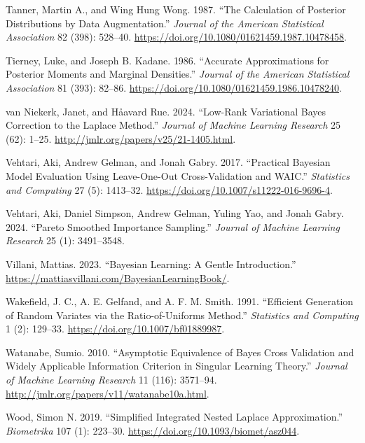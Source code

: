 \documentclass[
  11pt,
  letterpaper,
]{scrbook}
\newlength{\cslhangindent}
\newenvironment{CSLReferences}[2] %
 {\begin{list}{}{%
  \setlength{\itemindent}{0pt}
  \setlength{\leftmargin}{0pt}
  \setlength{\parsep}{0pt}
  \ifodd #1
   \setlength{\leftmargin}{\cslhangindent}
   \setlength{\itemindent}{-1\cslhangindent}
  \fi
  \setlength{\itemsep}{#2\baselineskip}}}
 {\end{list}}
\theoremstyle{plain}
\theoremstyle{plain}
\theoremstyle{plain}
\theoremstyle{definition}
\theoremstyle{definition}
\theoremstyle{definition}
\theoremstyle{remark}
\begin{document}
\begin{CSLReferences}{1}{0}
Tanner, Martin A., and Wing Hung Wong. 1987. {``The Calculation of
Posterior Distributions by Data Augmentation.''} \emph{Journal of the
American Statistical Association} 82 (398): 528--40.
\url{https://doi.org/10.1080/01621459.1987.10478458}.

Tierney, Luke, and Joseph B. Kadane. 1986. {``Accurate Approximations
for Posterior Moments and Marginal Densities.''} \emph{Journal of the
American Statistical Association} 81 (393): 82--86.
\url{https://doi.org/10.1080/01621459.1986.10478240}.

van Niekerk, Janet, and Håavard Rue. 2024. {``Low-Rank Variational
{B}ayes Correction to the {L}aplace Method.''} \emph{Journal of Machine
Learning Research} 25 (62): 1--25.
\url{http://jmlr.org/papers/v25/21-1405.html}.

Vehtari, Aki, Andrew Gelman, and Jonah Gabry. 2017. {``Practical
{B}ayesian Model Evaluation Using Leave-One-Out Cross-Validation and
{WAIC}.''} \emph{Statistics and Computing} 27 (5): 1413--32.
\url{https://doi.org/10.1007/s11222-016-9696-4}.

Vehtari, Aki, Daniel Simpson, Andrew Gelman, Yuling Yao, and Jonah
Gabry. 2024. {``Pareto Smoothed Importance Sampling.''} \emph{Journal of
Machine Learning Research} 25 (1): 3491--3548.

Villani, Mattias. 2023. {``Bayesian Learning: A Gentle Introduction.''}
\url{https://mattiasvillani.com/BayesianLearningBook/}.

Wakefield, J. C., A. E. Gelfand, and A. F. M. Smith. 1991. {``Efficient
Generation of Random Variates via the Ratio-of-Uniforms Method.''}
\emph{Statistics and Computing} 1 (2): 129--33.
\url{https://doi.org/10.1007/bf01889987}.

Watanabe, Sumio. 2010. {``Asymptotic Equivalence of {B}ayes Cross
Validation and Widely Applicable Information Criterion in Singular
Learning Theory.''} \emph{Journal of Machine Learning Research} 11
(116): 3571--94. \url{http://jmlr.org/papers/v11/watanabe10a.html}.

Wood, Simon N. 2019. {``Simplified Integrated Nested {L}aplace
Approximation.''} \emph{Biometrika} 107 (1): 223--30.
\url{https://doi.org/10.1093/biomet/asz044}.


\end{CSLReferences}
\end{document}
